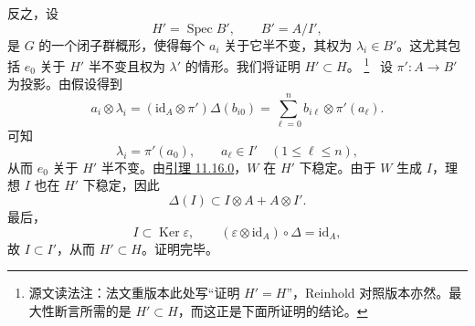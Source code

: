 反之，设
\[
  H'=\operatorname{Spec}B',
  \qquad
  B'=A/I',
\]
是 \(G\) 的一个闭子群概形，使得每个 \(a_i\) 关于它半不变，其权为 \(\lambda_i\in B'\)。这尤其包括 \(e_0\) 关于 \(H'\) 半不变且权为 \(\lambda'\) 的情形。我们将证明 \(H'\subset H\)。%
\begingroup
\renewcommand{\thefootnote}{\fnsymbol{footnote}}%
\footnote[3]{\label{note:sga3-VIB-11.16-maximality-source-reading}
源文读法注：法文重版本此处写“证明 \(H'=H\)”，Reinhold 对照版本亦然。最大性断言所需的是 \(H'\subset H\)，而这正是下面所证明的结论。}
\endgroup\ 
设 \(\pi':A\to B'\) 为投影。由假设得到
\label{form:sga3-VIB-11.16-converse-coefficients}%
\[
  a_i\otimes\lambda_i
  =
  (\mathrm{id}_A\otimes\pi')\Delta(b_{i0})
  =
  \sum_{\ell=0}^{n}b_{i\ell}\otimes\pi'(a_\ell).
\]
可知
\[
  \lambda_i=\pi'(a_0),
  \qquad
  a_\ell\in I'\quad(1\leq\ell\leq n),
\]
从而 \(e_0\) 关于 \(H'\) 半不变。由\hyperref[lem:sga3-VIB-11.16.0]{引理 11.16.0}，\(W\) 在 \(H'\) 下稳定。由于 \(W\) 生成 \(I\)，理想 \(I\) 也在 \(H'\) 下稳定，因此
\[
  \Delta(I)\subset I\otimes A+A\otimes I'.
\]
最后，
\[
  I\subset\operatorname{Ker}\varepsilon,
  \qquad
  (\varepsilon\otimes\mathrm{id}_A)\circ\Delta
    =\mathrm{id}_A,
\]
故 \(I\subset I'\)，从而 \(H'\subset H\)。证明完毕。
